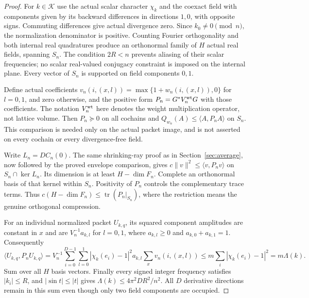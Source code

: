 \documentclass[11pt]{article}
\begin{document}
\begin{proof}
For $k\in\mathcal K$ use the actual scalar character $\chi_k$ and the
coexact field with components given by its backward differences in
directions $1,0$, with opposite signs. Commuting differences give actual
divergence zero. Since $k_0\neq0\pmod n$, the normalization denominator is
positive. Counting Fourier orthogonality and both internal real quadratures
produce an orthonormal family of $H$ actual real fields, spanning $S_n$.
The condition $2R<n$ prevents aliasing of their scalar frequencies; no
scalar real-valued conjugacy constraint is imposed on the internal plane.
Every vector of $S_n$ is supported on field components $0,1$.

Define actual coefficients $v_n(i,(x,l))=\max\{1+w_n(i,(x,l)),0\}$ for
$l=0,1$, and zero otherwise, and the positive form $P_n=G^*V_n^{\rm wt}G$
with those coefficients. The notation $V_n^{\rm wt}$ here denotes the
weight multiplication operator, not lattice volume. Then $P_n\succeq0$
on all cochains and $Q_{w_n}(A)\leq\langle A,P_nA\rangle$ on $S_n$.
This comparison is needed only on the actual packet image, and is not
asserted on every cochain or every divergence-free field.

Write $L_n=DC_n(0)$. The same shrinking-ray proof as in
Section~\ref{sec:average}, now followed by the proved envelope comparison,
gives $c\|v\|^2\leq\langle v,P_nv\rangle$ on $S_n\cap\ker L_n$.
Its dimension is at least $H-\dim F_n$. Complete an orthonormal basis of
that kernel within $S_n$. Positivity of $P_n$ controls the complementary
trace terms. Thus $c(H-\dim F_n)\leq\operatorname{tr}(P_n|_{S_n})$, where
the restriction means the genuine orthogonal compression.

For an individual normalized packet $U_{k,q}$, its squared component
amplitudes are constant in $x$ and are $V_n^{-1}a_{k,l}$ for $l=0,1$,
where $a_{k,l}\geq0$ and $a_{k,0}+a_{k,1}=1$. Consequently
\[
 \langle U_{k,q},P_nU_{k,q}\rangle
 =V_n^{-1}\sum_{i=0}^{D-1}\sum_{l=0}^{1}
   |\chi_k(e_i)-1|^2 a_{k,l}\sum_x v_n(i,(x,l))
 \leq m\sum_i|\chi_k(e_i)-1|^2=m\Lambda(k).
\]
Sum over all $H$ basis vectors. Finally every signed integer frequency
satisfies $|k_i|\leq R$, and $|\sin t|\leq|t|$ gives
$\Lambda(k)\leq4\pi^2DR^2/n^2$. All $D$ derivative directions remain in
this sum even though only two field components are occupied.
\end{proof}
\end{document}
